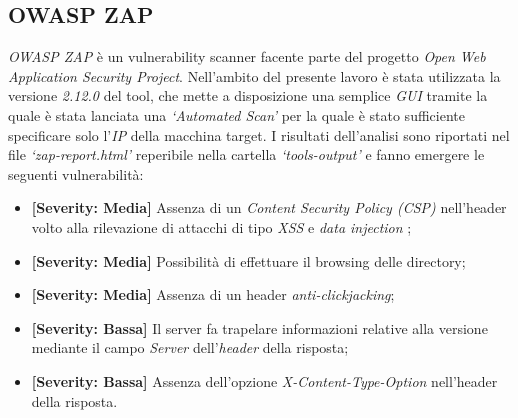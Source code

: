 \subsection{OWASP ZAP}
\emph{OWASP ZAP} è un vulnerability scanner facente parte del progetto \emph{Open Web Application Security Project}. Nell'ambito del presente lavoro è stata utilizzata la versione \emph{2.12.0} del tool, che mette a disposizione una semplice \emph{GUI} tramite la quale è stata lanciata una \emph{`Automated Scan'} per la quale è stato sufficiente specificare solo l'\emph{IP} della macchina target. I risultati dell'analisi sono riportati nel file \emph{`zap-report.html'} reperibile nella cartella \emph{`tools-output'} e fanno emergere le seguenti vulnerabilità:
\begin{itemize}
    \item \textbf{[Severity: Media]} Assenza di un \emph{Content Security Policy (CSP)} nell'header volto alla rilevazione di attacchi di tipo \emph{XSS} e \emph{data injection} \cite{csp};
    \item \textbf{[Severity: Media]} Possibilità di effettuare il browsing delle directory;
    \item \textbf{[Severity: Media]} Assenza di un header \emph{anti-clickjacking};
    \item \textbf{[Severity: Bassa]} Il server fa trapelare informazioni relative alla versione mediante il campo \emph{Server} dell'\emph{header} della risposta;
    \item \textbf{[Severity: Bassa]} Assenza dell'opzione \emph{X-Content-Type-Option} nell'header della risposta.
\end{itemize}
